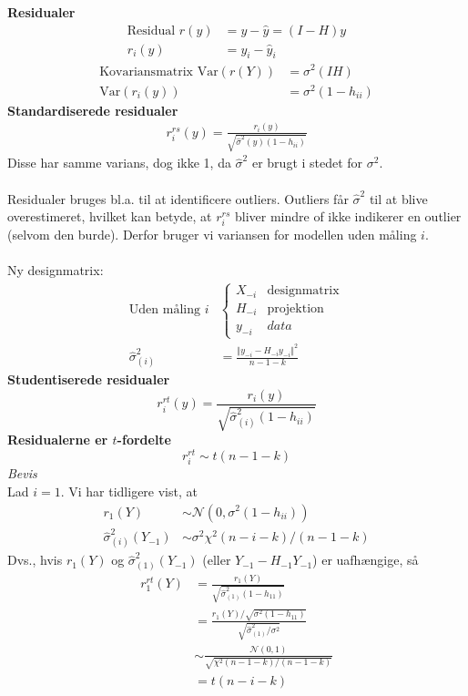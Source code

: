 \documentclass[12pt,a4paper]{report}
\author{Frederik Appel Vardinghus-Nielsen}
\begin{document}
\noindent\textbf{Residualer}
\begin{align*}
\text{Residual } r(y)&=y-\hat{y}=(I-H)y\\
r_i(y)&=y_i-\hat{y}_i
\end{align*}
\begin{align*}
\text{Kovariansmatrix Var}(r(Y))&=\sigma^2(IH)\\
\text{Var}(r_i(y))&=\sigma^2(1-h_{ii})
\end{align*}
\textbf{Standardiserede residualer}
\begin{align*}
r_i^{rs}(y)=\frac{r_i(y)}{\sqrt{\hat{\sigma}^2(y)(1-h_{ii})}}
\end{align*}
Disse har samme varians, dog ikke 1, da $\hat{\sigma}^2$ er brugt i stedet for $\sigma^2$.\\\\
Residualer bruges bl.a. til at identificere outliers. Outliers får $\hat{\sigma}^2$ til at blive overestimeret, hvilket kan betyde, at $r_i^{rs}$ bliver mindre of ikke indikerer en outlier (selvom den burde). Derfor bruger vi variansen for modellen uden måling $i$.\\\\
Ny designmatrix:
\begin{align*}
\text{Uden måling }i&\begin{cases}X_{-i}&\text{designmatrix}\\
H_{-i}&\text{projektion}\\
y_{-i}&data
\end{cases}\\
\hat{\sigma}^2_{(i)}&=\frac{\Vert y_{-i}-H_{-i}y_{-i}\Vert^2}{n-1-k}
\end{align*}
\textbf{Studentiserede residualer}
\begin{equation*}
r_i^{rt}(y)=\frac{r_i(y)}{\sqrt{\hat{\sigma}^2_{(i)}(1-h_{ii})}}
\end{equation*}
\textbf{Residualerne er $t$-fordelte}
\begin{equation*}
r_i^{rt}\sim t(n-1-k)
\end{equation*}
\textit{Bevis}\\
Lad $i=1$. Vi har tidligere vist, at
\begin{align*}
r_1(Y)&\sim\mathcal{N}(0,\sigma^2(1-h_{ii}))\\
\hat{\sigma}^2_{(i)}(Y_{-1})&\sim\sigma^2\chi^2(n-i-k)/(n-1-k)
\end{align*}
Dvs., hvis $r_1(Y)$ og $\hat{\sigma}_{(1)}^2(Y_{-1})$ (eller $Y_{-1}-H_{-1}Y_{-1}$) er uafhængige, så
\begin{align*}
r_1^{rt}(Y)&=\frac{r_1(Y)}{\sqrt{\hat{\sigma}^2_{(1)}(1-h_{11})}}\\
&=\frac{r_1(Y)/\sqrt{\sigma^2(1-h_{11})}}{\sqrt{\hat{\sigma}^2_{(1)}/\sigma^2}}\\
&\sim\frac{\mathcal{N}(0,1)}{\sqrt{\chi^2(n-1-k)/(n-1-k)}}\\
&=t(n-i-k)
\end{align*}
\end{document}
